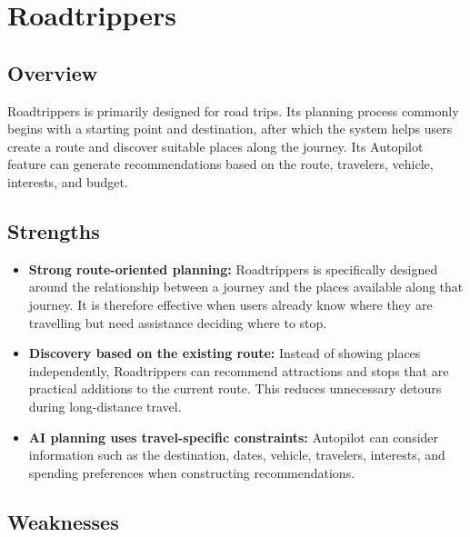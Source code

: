 \section{Roadtrippers}

\subsection{Overview}

Roadtrippers is primarily designed for road trips. Its planning process commonly begins with a starting point and destination, after which the system helps users create a route and discover suitable places along the journey. Its Autopilot feature can generate recommendations based on the route, travelers, vehicle, interests, and budget.


\subsection{Strengths}

\begin{itemize}
\item \textbf{Strong route-oriented planning:} Roadtrippers is specifically designed around the relationship between a journey and the places available along that journey. It is therefore effective when users already know where they are travelling but need assistance deciding where to stop.
\item \textbf{Discovery based on the existing route:} Instead of showing places independently, Roadtrippers can recommend attractions and stops that are practical additions to the current route. This reduces unnecessary detours during long-distance travel.
\item \textbf{AI planning uses travel-specific constraints:} Autopilot can consider information such as the destination, dates, vehicle, travelers, interests, and spending preferences when constructing recommendations.
\end{itemize}


\subsection{Weaknesses}

